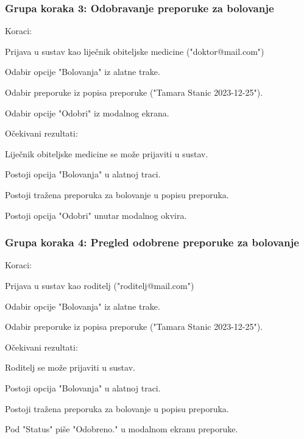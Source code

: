			 \subsubsection*{Grupa koraka 3: Odobravanje preporuke za bolovanje}
			 Koraci:
			 \begin{packed_enum}
				\item Prijava u sustav kao liječnik obiteljske medicine ("doktor@mail.com")
				\item Odabir opcije "Bolovanja" iz alatne trake.
				\item Odabir preporuke iz popisa preporuke ("Tamara Stanic 2023-12-25").
				\item Odabir opcije "Odobri" iz modalnog ekrana.
			 \end{packed_enum}
			 Očekivani rezultati:
			 \begin{packed_enum}
				\item Liječnik obiteljske medicine se može prijaviti u sustav.
				\item Postoji opcija "Bolovanja" u alatnoj traci.
				\item Postoji tražena preporuka za bolovanje u popisu preporuka.
				\item Postoji opcija "Odobri" unutar modalnog okvira.
			 \end{packed_enum}

			 \subsubsection*{Grupa koraka 4: Pregled odobrene preporuke za bolovanje}
			 Koraci:
			 \begin{packed_enum}
				\item Prijava u sustav kao roditelj ("roditelj@mail.com")
				\item Odabir opcije "Bolovanja" iz alatne trake.
				\item Odabir preporuke iz popisa preporuke ("Tamara Stanic 2023-12-25").
			 \end{packed_enum}
			 Očekivani rezultati:
			 \begin{packed_enum}
				\item Roditelj se može prijaviti u sustav.
				\item Postoji opcija "Bolovanja" u alatnoj traci.
				\item Postoji tražena preporuka za bolovanje u popisu preporuka.
				\item Pod "Status" piše "Odobreno." u modalnom ekranu preporuke.
			 \end{packed_enum}
			\eject
		
